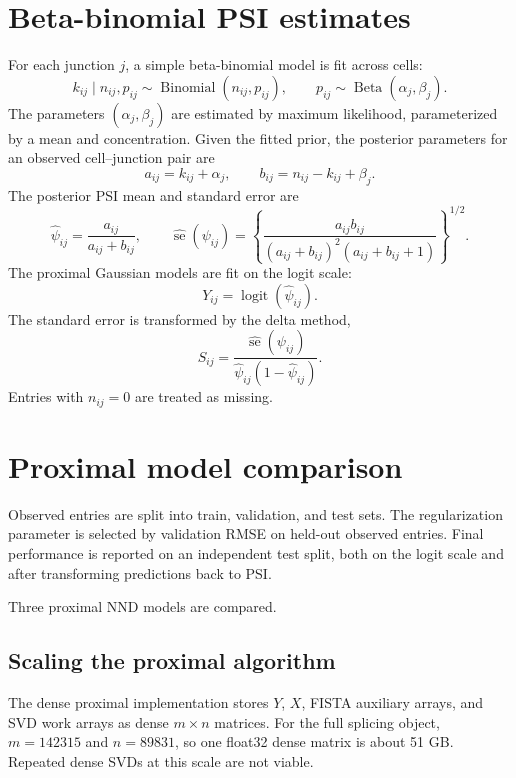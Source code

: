 \documentclass[11pt]{article}
\begin{document}
\section{Beta-binomial PSI estimates}

For each junction \(j\), a simple beta-binomial model is fit across cells:
\[
k_{ij}\mid n_{ij},p_{ij} \sim \operatorname{Binomial}(n_{ij},p_{ij}),
\qquad
p_{ij}\sim \operatorname{Beta}(\alpha_j,\beta_j).
\]
The parameters \((\alpha_j,\beta_j)\) are estimated by maximum likelihood,
parameterized by a mean and concentration.  Given the fitted prior, the
posterior parameters for an observed cell--junction pair are
\[
a_{ij}=k_{ij}+\alpha_j,\qquad
b_{ij}=n_{ij}-k_{ij}+\beta_j.
\]
The posterior PSI mean and standard error are
\[
\widehat{\psi}_{ij}
  = \frac{a_{ij}}{a_{ij}+b_{ij}},
\qquad
\widehat{\operatorname{se}}(\psi_{ij})
  =
  \left\{
  \frac{a_{ij}b_{ij}}
  {(a_{ij}+b_{ij})^2(a_{ij}+b_{ij}+1)}
  \right\}^{1/2}.
\]
The proximal Gaussian models are fit on the logit scale:
\[
Y_{ij}=\operatorname{logit}(\widehat{\psi}_{ij}).
\]
The standard error is transformed by the delta method,
\[
S_{ij}
  =
  \frac{\widehat{\operatorname{se}}(\psi_{ij})}
       {\widehat{\psi}_{ij}(1-\widehat{\psi}_{ij})}.
\]
Entries with \(n_{ij}=0\) are treated as missing.

\section{Proximal model comparison}

Observed entries are split into train, validation, and test sets.  The
regularization parameter is selected by validation RMSE on held-out observed
entries.  Final performance is reported on an independent test split, both on
the logit scale and after transforming predictions back to PSI.

Three proximal NND models are compared.

\subsection{Scaling the proximal algorithm}

The dense proximal implementation stores \(Y\), \(X\), FISTA auxiliary arrays,
and SVD work arrays as dense \(m\times n\) matrices.  For the full splicing
object, \(m=142315\) and \(n=89831\), so one float32 dense matrix is about
51 GB.  Repeated dense SVDs at this scale are not viable.
\end{document}
